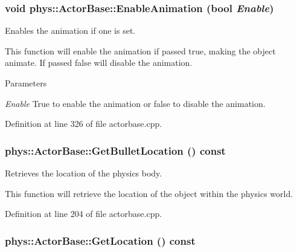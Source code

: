 \hypertarget{classphys_1_1ActorBase_a72203a9c7befd1ab606ff69af4183849}{
\subsubsection[{EnableAnimation}]{\setlength{\rightskip}{0pt plus 5cm}void phys::ActorBase::EnableAnimation (bool {\em Enable})}}
\label{d8/d0f/classphys_1_1ActorBase_a72203a9c7befd1ab606ff69af4183849}


Enables the animation if one is set. 

This function will enable the animation if passed true, making the object animate. If passed false will disable the animation. 
\begin{DoxyParams}{Parameters}
\item[{\em Enable}]True to enable the animation or false to disable the animation. \end{DoxyParams}


Definition at line 326 of file actorbase.cpp.

\hypertarget{classphys_1_1ActorBase_a9b32df1efdc346f5d6c0920b959c09a3}{
\subsubsection[{GetBulletLocation}]{ phys::ActorBase::GetBulletLocation () const}}
\label{d8/d0f/classphys_1_1ActorBase_a9b32df1efdc346f5d6c0920b959c09a3}


Retrieves the location of the physics body. 

This function will retrieve the location of the object within the physics world. 

Definition at line 204 of file actorbase.cpp.

\hypertarget{classphys_1_1ActorBase_a777b4ea4d6881af76c646b1ba9324d96}{
\subsubsection[{GetLocation}]{ phys::ActorBase::GetLocation () const}}
\label{d8/d0f/classphys_1_1ActorBase_a777b4ea4d6881af76c646b1ba9324d96}


